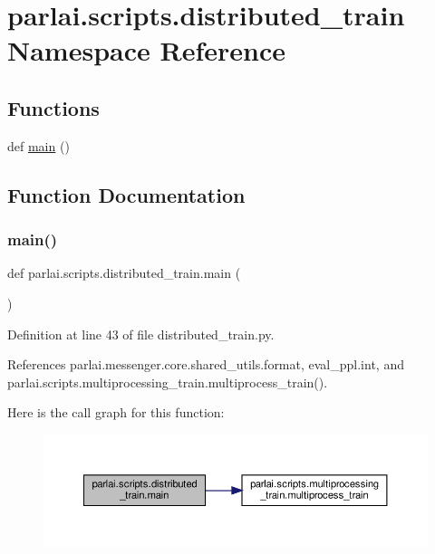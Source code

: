 \hypertarget{namespaceparlai_1_1scripts_1_1distributed__train}{}\section{parlai.\+scripts.\+distributed\+\_\+train Namespace Reference}
\label{namespaceparlai_1_1scripts_1_1distributed__train}
\subsection*{Functions}
\begin{DoxyCompactItemize}
\item 
def \hyperlink{namespaceparlai_1_1scripts_1_1distributed__train_a8fb5ab65a3210ae3a91ec244aeaf49f7}{main} ()
\end{DoxyCompactItemize}


\subsection{Function Documentation}
\mbox{\label{namespaceparlai_1_1scripts_1_1distributed__train_a8fb5ab65a3210ae3a91ec244aeaf49f7}} 
\subsubsection{\texorpdfstring{main()}{main()}}
{\footnotesize\ttfamily def parlai.\+scripts.\+distributed\+\_\+train.\+main (\begin{DoxyParamCaption}{ }\end{DoxyParamCaption})}



Definition at line 43 of file distributed\+\_\+train.\+py.



References parlai.\+messenger.\+core.\+shared\+\_\+utils.\+format, eval\+\_\+ppl.\+int, and parlai.\+scripts.\+multiprocessing\+\_\+train.\+multiprocess\+\_\+train().

Here is the call graph for this function\+:
\nopagebreak
\begin{figure}[H]
\begin{center}
\leavevmode
\includegraphics[width=350pt]{namespaceparlai_1_1scripts_1_1distributed__train_a8fb5ab65a3210ae3a91ec244aeaf49f7_cgraph}
\end{center}
\end{figure}
